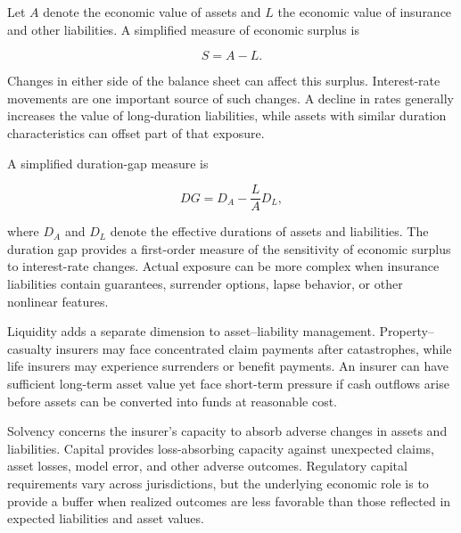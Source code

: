 Let $A$ denote the economic value of assets and $L$ the economic value of insurance and other liabilities. A simplified measure of economic surplus is

\begin{equation}
S=A-L.
\label{eq:ch15-economic-surplus}
\end{equation}

Changes in either side of the balance sheet can affect this surplus. Interest-rate movements are one important source of such changes. A decline in rates generally increases the value of long-duration liabilities, while assets with similar duration characteristics can offset part of that exposure.

A simplified duration-gap measure is

\begin{equation}
DG=D_A-\frac{L}{A}D_L,
\label{eq:ch15-insurer-duration-gap}
\end{equation}

where $D_A$ and $D_L$ denote the effective durations of assets and liabilities. The duration gap provides a first-order measure of the sensitivity of economic surplus to interest-rate changes. Actual exposure can be more complex when insurance liabilities contain guarantees, surrender options, lapse behavior, or other nonlinear features.

Liquidity adds a separate dimension to asset--liability management. Property--casualty insurers may face concentrated claim payments after catastrophes, while life insurers may experience surrenders or benefit payments. An insurer can have sufficient long-term asset value yet face short-term pressure if cash outflows arise before assets can be converted into funds at reasonable cost.

Solvency concerns the insurer's capacity to absorb adverse changes in assets and liabilities. Capital provides loss-absorbing capacity against unexpected claims, asset losses, model error, and other adverse outcomes. Regulatory capital requirements vary across jurisdictions, but the underlying economic role is to provide a buffer when realized outcomes are less favorable than those reflected in expected liabilities and asset values.


